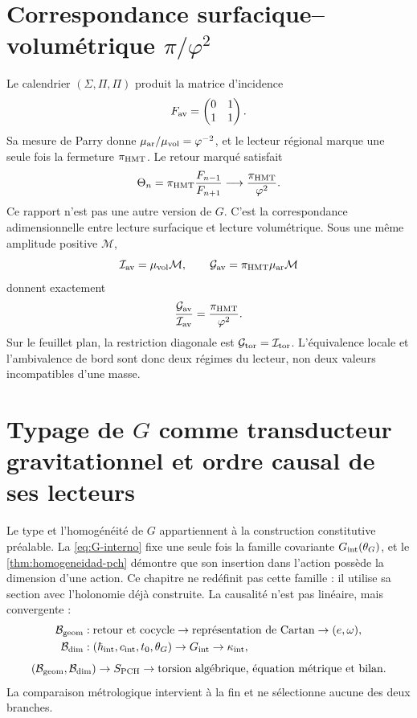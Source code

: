 \section{Correspondance surfacique–volumétrique \(\pi/\varphi^2\)}

Le calendrier \((\Sigma,\Pi,\Pi)\) produit la matrice d'incidence
\[
 F_{\rm av}=\begin{pmatrix}0&1\\1&1\end{pmatrix}.
\]
Sa mesure de Parry donne
\(\mu_{\rm ar}/\mu_{\rm vol}=\varphi^{-2}\), et le lecteur régional marque une
seule fois la fermeture \(\pi_{\rm HMT}\). Le retour marqué satisfait
\[
 \Theta_n
 =\pi_{\rm HMT}\frac{F_{n-1}}{F_{n+1}}
 \longrightarrow
 \frac{\pi_{\rm HMT}}{\varphi^2}.
\]
Ce rapport n'est pas une autre version de \(G\). C'est la correspondance adimensionnelle entre
lecture surfacique et lecture volumétrique. Sous une même amplitude positive
\(\mathcal M\),
\[
 \mathcal I_{\rm av}=\mu_{\rm vol}\mathcal M,\qquad
 \mathcal G_{\rm av}=\pi_{\rm HMT}\mu_{\rm ar}\mathcal M
\]
donnent exactement
\[
 \frac{\mathcal G_{\rm av}}{\mathcal I_{\rm av}}
 =\frac{\pi_{\rm HMT}}{\varphi^2}.
\]
Sur le feuillet plan, la restriction diagonale est
\(\mathcal G_{\rm tor}=\mathcal I_{\rm tor}\). L'équivalence locale et
l'ambivalence de bord sont donc deux régimes du lecteur, non deux
valeurs incompatibles d'une masse.

\section{Typage de \(G\) comme transducteur gravitationnel et ordre causal de ses lecteurs}

Le type et l'homogénéité de \(G\) appartiennent à la construction
constitutive préalable. La \cref{eq:G-interno} fixe une seule fois la famille
covariante \(G_{\rm int}(\theta_G)\), et le
\cref{thm:homogeneidad-pch} démontre que son insertion dans l'action possède
la dimension d'une action. Ce chapitre ne redéfinit pas cette famille : il utilise sa
section avec l'holonomie déjà construite. La causalité n'est pas linéaire,
mais convergente :
\[
\begin{aligned}
 \mathcal B_{\rm geom}&:
 \text{retour et cocycle}\to\text{représentation de Cartan}
 \to(e,\omega),\\
 \mathcal B_{\rm dim}&:
 (\hbar_{\rm int},c_{\rm int},t_0,\theta_G)
 \to G_{\rm int}\to\kappa_{\rm int},
\end{aligned}
\]
\[
 (\mathcal B_{\rm geom},\mathcal B_{\rm dim})
 \to S_{\rm PCH}
 \to\text{torsion algébrique, équation métrique et bilan}.
\]
La comparaison métrologique intervient à la fin et ne sélectionne aucune des
deux branches.

